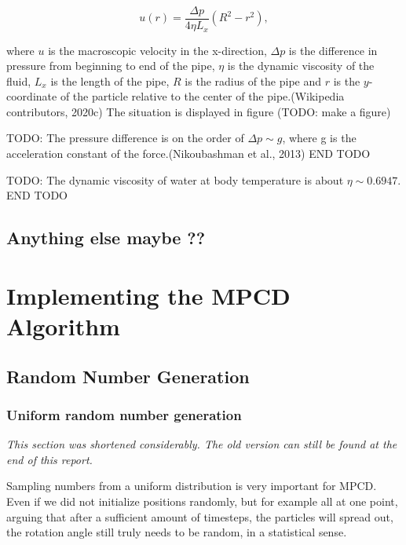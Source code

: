 \documentclass[
]{article}
\begin{document}
\begin{equation}
u(r) = \frac{\Delta p}{4\eta L_x} (R^2 - r^2),
\end{equation}

where \(u\) is the macroscopic velocity in the x-direction, \(\Delta p\)
is the difference in pressure from beginning to end of the pipe,
\(\eta\) is the dynamic viscosity of the fluid, \(L_x\) is the length of
the pipe, \(R\) is the radius of the pipe and \(r\) is the
\(y\)-coordinate of the particle relative to the center of the
pipe.(Wikipedia contributors, 2020c) The situation is displayed in
figure (TODO: make a figure)

TODO: The pressure difference is on the order of \(\Delta p \sim g\),
where g is the acceleration constant of the force.(Nikoubashman et al.,
2013) END TODO

TODO: The dynamic viscosity of water at body temperature is about
\(\eta \sim 0.6947\). END TODO

\hypertarget{anything-else-maybe}{%
\subsection{Anything else maybe ??}\label{anything-else-maybe}}

\hypertarget{implementing-the-mpcd-algorithm}{%
\section{Implementing the MPCD
Algorithm}\label{implementing-the-mpcd-algorithm}}

\hypertarget{random-number-generation}{%
\subsection{Random Number Generation}\label{random-number-generation}}

\hypertarget{uniform-random-number-generation}{%
\subsubsection{Uniform random number
generation}\label{uniform-random-number-generation}}

\emph{This section was shortened considerably. The old version can still
be found at the end of this report.}

Sampling numbers from a uniform distribution is very important for MPCD.
Even if we did not initialize positions randomly, but for example all at
one point, arguing that after a sufficient amount of timesteps, the
particles will spread out, the rotation angle still truly needs to be
random, in a statistical sense.
\end{document}
